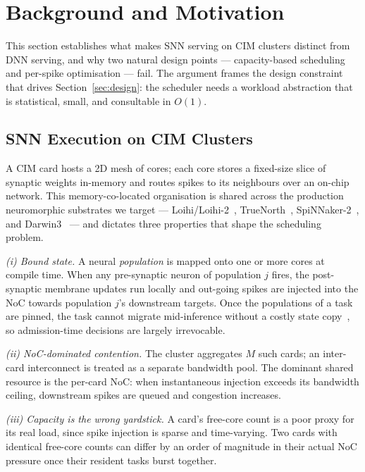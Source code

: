 \documentclass[letterpaper,twocolumn,10pt]{article}
\begin{document}
\section{Background and Motivation}
\label{sec:background}

This section establishes what makes SNN serving on CIM clusters distinct from DNN serving, and why two natural design points --- capacity-based scheduling and per-spike optimisation --- fail. The argument frames the design constraint that drives Section~\ref{sec:design}: the scheduler needs a workload abstraction that is statistical, small, and consultable in $O(1)$.

\subsection{SNN Execution on CIM Clusters}
\label{sec:bg:hardware}

A CIM card hosts a 2D mesh of cores; each core stores a fixed-size slice of synaptic weights in-memory and routes spikes to its neighbours over an on-chip network. This memory-co-located organisation is shared across the production neuromorphic substrates we target --- Loihi/Loihi-2~\cite{davies2018loihi, orchard2021loihi2}, TrueNorth~\cite{merolla2014truenorth}, SpiNNaker-2~\cite{mayr2019spinnaker2}, and Darwin3~\cite{ma2024darwin3} --- and dictates three properties that shape the scheduling problem.

\emph{(i) Bound state.} A neural \emph{population} is mapped onto one or more cores at compile time. When any pre-synaptic neuron of population $j$ fires, the post-synaptic membrane updates run locally and out-going spikes are injected into the NoC towards population $j$'s downstream targets. Once the populations of a task are pinned, the task cannot migrate mid-inference without a costly state copy~\cite{xiao2018gandiva}, so admission-time decisions are largely irrevocable.

\emph{(ii) NoC-dominated contention.} The cluster aggregates $M$ such cards; an inter-card interconnect is treated as a separate bandwidth pool. The dominant shared resource is the per-card NoC: when instantaneous injection exceeds its bandwidth ceiling, downstream spikes are queued and congestion increases.

\emph{(iii) Capacity is the wrong yardstick.} A card's free-core count is a poor proxy for its real load, since spike injection is sparse and time-varying. Two cards with identical free-core counts can differ by an order of magnitude in their actual NoC pressure once their resident tasks burst together.
\end{document}
